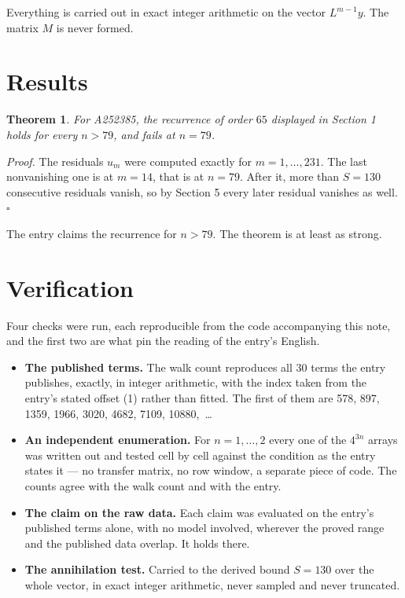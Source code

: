 \documentclass[11pt]{article}
\newtheorem{theorem}{Theorem}
\theoremstyle{definition}
\begin{document}
Everything is carried out in exact integer arithmetic on the vector $L^{m-1}y$. The matrix $M$ is never formed.

\section{Results}

\begin{theorem} For A252385, the recurrence of order $65$ displayed in Section 1 holds for every $n > 79$, and fails at $n = 79$.\end{theorem}

{\itshape Proof.} The residuals $u_m$ were computed exactly for $m = 1,\dots,231$. The last nonvanishing one is at $m = 14$, that is at $n = 79$. After it, more than $S = 130$ consecutive residuals vanish, so by Section 5 every later residual vanishes as well. $\square$

The entry claims the recurrence for $n > 79$. The theorem is at least as strong.

\section{Verification}

Four checks were run, each reproducible from the code accompanying this note, and the first two are what pin the reading of the entry's English.

\begin{itemize}

\item {\bfseries The published terms.} The walk count reproduces all 30 terms the entry publishes, exactly, in integer arithmetic, with the index taken from the entry's stated offset (1) rather than fitted. The first of them are 578, 897, 1359, 1966, 3020, 4682, 7109, 10880,~\dots

\item {\bfseries An independent enumeration.} For $n = 1,\dots,2$ every one of the $4^{3n}$ arrays was written out and tested cell by cell against the condition as the entry states it --- no transfer matrix, no row window, a separate piece of code. The counts agree with the walk count and with the entry.

\item {\bfseries The claim on the raw data.} Each claim was evaluated on the entry's published terms alone, with no model involved, wherever the proved range and the published data overlap. It holds there.

\item {\bfseries The annihilation test.} Carried to the derived bound $S = 130$ over the whole vector, in exact integer arithmetic, never sampled and never truncated.

\end{itemize}
\end{document}

